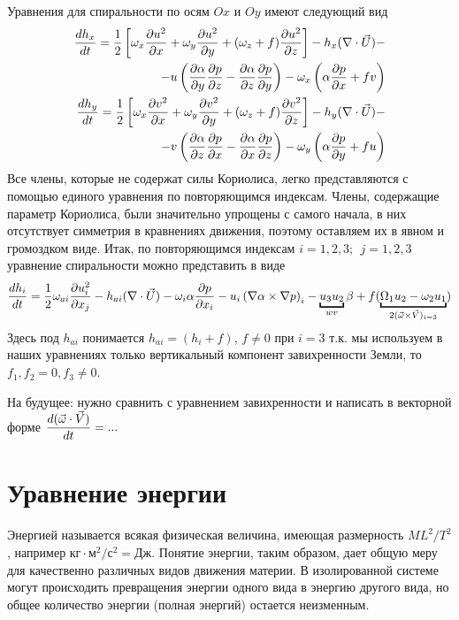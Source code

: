 Уравнения для спиральности по осям $Ox$ и $Oy$ имеют следующий вид
\begin{align}
    \displaystyle\frac{d h_x}{d t} = \frac{1}{2} \displaystyle \left[  \omega_x\displaystyle\frac{\partial u^2}{\partial x} + \omega_y\displaystyle\frac{\partial u^2}{\partial y} + (\omega_z+f)\displaystyle\frac{\partial u^2}{\partial z}  \right] - h_x (\nabla\cdot\vec{U}) - \\
    - u \displaystyle \left(  \displaystyle\frac{\partial \alpha}{\partial y}\displaystyle\frac{\partial p}{\partial z} - \displaystyle\frac{\partial \alpha}{\partial z}\displaystyle\frac{\partial p}{\partial y}   \right) - \omega_x \displaystyle \left(  \alpha\displaystyle\frac{\partial p}{\partial x}+fv  \right) \label{eq:ch10-curlx} \\
    \displaystyle\frac{d h_y}{d t} = \frac{1}{2} \displaystyle \left[  \omega_x\displaystyle\frac{\partial v^2}{\partial x} + \omega_y\displaystyle\frac{\partial v^2}{\partial y} + (\omega_z+f)\displaystyle\frac{\partial v^2}{\partial z}  \right] - h_y (\nabla\cdot\vec{U}) - \\
    - v \displaystyle \left(  \displaystyle\frac{\partial \alpha}{\partial z}\displaystyle\frac{\partial p}{\partial x} - \displaystyle\frac{\partial \alpha}{\partial x}\displaystyle\frac{\partial p}{\partial z}   \right) - \omega_y \displaystyle \left(  \alpha\displaystyle\frac{\partial p}{\partial y}+fu  \right) \label{eq:ch10-curly} 
\end{align}
Все члены, которые не содержат силы Кориолиса, легко представляются с помощью единого уравнения по повторяющимся индексам. Члены, содержащие параметр Кориолиса, были значительно упрощены с самого начала, в них отсутствует симметрия в кравнениях движения, поэтому оставляем их в явном и громоздком виде. Итак, по повторяющимся индексам $i=1,2,3; \:\: j=1,2,3$ уравнение спиральности можно представить в виде 
\begin{equation}
    \label{eq:ch10-curl_ij}
    \td{h_i}{t} = \frac{1}{2} \omega_{ai}\pd{u_{i}^2}{x_j} - 
        h_{ai} (\nabla\cdot\vec{U}) - 
        \omega_i\alpha\pd{p}{x_i} - 
        u_i \rb{ \nabla\alpha\times \nabla p }_i - 
        \ub{u_3 u_2}_{wv} \beta + 
        f (\ub{\Omega_1 u_2 - \omega_2 u_1}_{2(\vec{\omega}\times\vec{V})_{i=3}})
\end{equation}
Здесь под $h_{ai}$ понимается $h_{ai}=(h_i+f)$, $f\neq0$ при $i=3$ т.к. мы используем в наших уравнениях только вертикальный компонент завихренности Земли, то $f_1, f_2=0, f_3\neq0$. 

\begin{warn}
    На будущее: нужно сравнить с уравнением завихренности и написать в векторной форме $\displaystyle\frac{d (\vec{\omega}\cdot\vec{V})}{d t}=...$
\end{warn}

\section{{\color{done}Уравнение энергии}}
Энергией называется всякая физическая величина, имеющая размерность $ML^2/T^2$, например $ \textrm{кг} \cdot \textrm{м}^2 / \textrm{с}^2= \textrm{Дж}$. Понятие энергии, таким образом, дает общую меру для качественно различных видов движения материи. В изолированной системе могут происходить превращения энергии одного вида в энергию другого вида, но общее количество энергии (полная энергий) остается неизменным.

